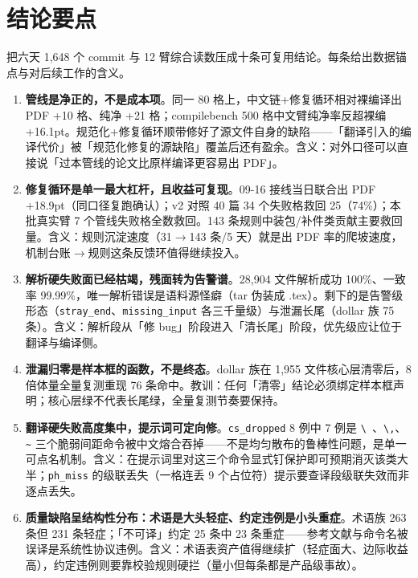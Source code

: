 \section{结论要点}
\label{sec:takeaway}

把六天 1{,}648 个 commit 与 12 臂综合读数压成十条可复用结论。每条给出数据锚点与对后续工作的含义。

\begin{enumerate}
  \item \textbf{管线是净正的，不是成本项}。同一 80 格上，中文链+修复循环相对裸编译出 PDF +10 格、纯净 +21 格；compilebench 500 格中文臂纯净率反超裸编 +16.1pt。规范化+修复循环顺带修好了源文件自身的缺陷——「翻译引入的编译代价」被「规范化修复的源缺陷」覆盖后还有盈余。含义：对外口径可以直接说「过本管线的论文比原样编译更容易出 PDF」。

  \item \textbf{修复循环是单一最大杠杆，且收益可复现}。09-16 接线当日联合出 PDF +18.9pt（同口径复跑确认）；v2 对照 40 篇 34 个失败格救回 25（74\%）；本批真实臂 7 个管线失败格全数救回。143 条规则中装包/补件类贡献主要救回量。含义：规则沉淀速度（31$\to$143 条/5 天）就是出 PDF 率的爬坡速度，机制台账$\to$规则这条反馈环值得继续投入。

  \item \textbf{解析硬失败面已经枯竭，残面转为告警谱}。28{,}904 文件解析成功 100\%、一致率 99.99\%，唯一解析错误是语料源怪癖（tar 伪装成 .tex）。剩下的是告警级形态（\texttt{stray\_end}、\texttt{missing\_input} 各三千量级）与泄漏长尾（dollar 族 75 条）。含义：解析段从「修 bug」阶段进入「清长尾」阶段，优先级应让位于翻译与编译侧。

  \item \textbf{泄漏归零是样本框的函数，不是终态}。dollar 族在 1{,}955 文件核心层清零后，8 倍体量全量复测重现 76 条命中。教训：任何「清零」结论必须绑定样本框声明；核心层绿不代表长尾绿，全量复测节奏要保持。

  \item \textbf{翻译硬失败高度集中，提示词可定向修}。\texttt{cs\_dropped} 8 例中 7 例是 \verb|\ |、\verb|\,|、\verb|~| 三个脆弱间距命令被中文熔合吞掉——不是均匀散布的鲁棒性问题，是单一可点名机制。含义：在提示词里对这三个命令显式钉保护即可预期消灭该类大半；\texttt{ph\_miss} 的级联丢失（一格连丢 9 个占位符）提示要查译段级联失效而非逐点丢失。

  \item \textbf{质量缺陷呈结构性分布：术语是大头轻症、约定违例是小头重症}。术语族 263 条但 231 条轻症；「不可译」约定 25 条中 23 条重症——参考文献与命令名被误译是系统性协议违例。含义：术语表资产值得继续扩（轻症面大、边际收益高），约定违例则要靠校验规则硬拦（量小但每条都是产品级事故）。


\end{enumerate}
